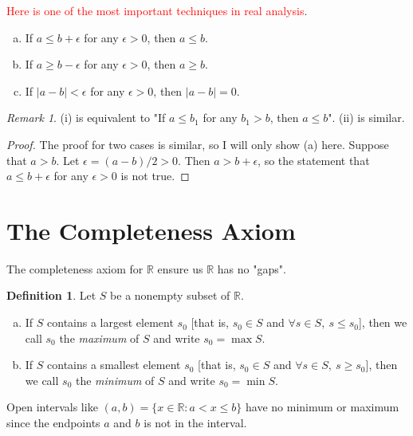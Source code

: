 \documentclass[12pt, lettersize]{book}
\theoremstyle{plain}
\theoremstyle{definition}
\newtheorem{dfn}[thm]{Definition}
\theoremstyle{remark}
\newtheorem*{rem}{Remark}
\newcommand{\R}{\mathbb{R}}
\begin{document}
		\begin{tcolorbox}
			\textcolor{red}{Here is one of the most important techniques in real analysis}.
			\begin{enumerate}[(a)]
				\item If $a\leq b+\epsilon$ for any $\epsilon>0$, then $a\leq b$.
				\item If $a\geq b-\epsilon$ for any $\epsilon>0$, then $a\geq b$.
				\item If $|a-b|<\epsilon$ for any $\epsilon>0$, then $|a-b|=0$.
			\end{enumerate}
			\tcblower
			\begin{rem}
				(i) is equivalent to "If $a\leq b_1$ for any $b_1>b$, then $a\leq b$". (ii) is similar.
			\end{rem}
			\tcblower
			\begin{proof}
				The proof for two cases is similar, so I will only show (a) here. Suppose that $a>b$. Let $\epsilon=(a-b)/2>0$. Then $a>b+\epsilon$, so the statement that $a\leq b+\epsilon$ for any $\epsilon>0$ is not true.
			\end{proof}
		\end{tcolorbox}
	
		\newpage
	\section{The Completeness Axiom}
		The completeness axiom for $\R$ ensure us $\R$ has no "gaps".
		\begin{dfn}\label{def:4.1}
		Let $S$ be a nonempty subset of $\R$.
		\begin{enumerate}[(a)]
			\item If $S$ contains a largest element $s_0$ [that is, $s_0\in S$ and $\forall s\in S,\ s\leq s_0$], then we call $s_0$ the \emph{maximum} of $S$ and write $s_0=\max S$.
			\item If $S$ contains a smallest element $s_0$ [that is, $s_0\in S$ and $\forall s\in S,\ s\geq s_0$], then we call $s_0$ the \emph{minimum} of $S$ and write $s_0=\min S$. 
		\end{enumerate}
		\end{dfn}
		Open intervals like $(a,b)=\{x\in\R: a<x\leq b\}$ have no minimum or maximum since the endpoints $a$ and $b$ is not in the interval.
		
\end{document}
